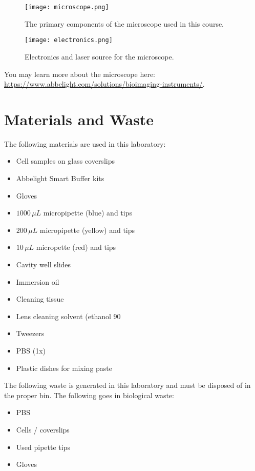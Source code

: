 \documentclass[10pt,a4paper,oneside]{book}
\begin{document}
\begin{figure}[ht]
    \centering
    \texttt{[image: microscope.png]}
    \caption{The primary components of the microscope used in this course.}
    \label{fig:microscope}
\end{figure}

\begin{figure}[ht]
    \centering
    \texttt{[image: electronics.png]}
    \caption{Electronics and laser source for the microscope.}
    \label{fig:electronics}
\end{figure}

You may learn more about the microscope here: \url{https://www.abbelight.com/solutions/bioimaging-instruments/}.

\section{Materials and Waste}

The following materials are used in this laboratory:

\begin{itemize}
  \item Cell samples on glass coverslips
  \item Abbelight Smart Buffer kits
  \item Gloves
  \item $1000 \, \mu L$ micropipette (blue) and tips
  \item $200 \, \mu L$ micropipette (yellow) and tips
  \item $10 \, \mu L$ micropette (red) and tips
  \item Cavity well slides
  \item Immersion oil
  \item Cleaning tissue
  \item Lens cleaning solvent (ethanol 90%
  \item Tweezers
  \item  PBS (1x)
  \item Plastic dishes for mixing paste
\end{itemize}

The following waste is generated in this laboratory and must be disposed of in the proper bin. The following goes in biological waste:

\begin{itemize}
  \item PBS
  \item Cells / coverslips
  \item Used pipette tips
  \item  Gloves
\end{itemize}
\end{document}
